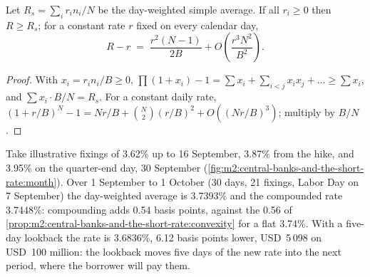 \begin{proposition}\label{prop:m2:central-banks-and-the-short-rate:convexity}
Let $R_s = \sum_i r_i n_i / N$ be the day-weighted simple average. If all
$r_i \ge 0$ then $R \ge R_s$; for a constant rate $r$ fixed on every calendar
day,
\[
R - r \;=\; \frac{r^2 (N-1)}{2B} + O\!\left(\frac{r^3N^2}{B^2}\right).
\]
\end{proposition}
\begin{proof}
With $x_i = r_i n_i / B \ge 0$, $\prod (1 + x_i) - 1 = \sum x_i + \sum_{i<j}
x_i x_j + \dots \ge \sum x_i$, and $\sum x_i \cdot B/N = R_s$. For a constant
daily rate, $(1 + r/B)^N - 1 = Nr/B + \binom{N}{2}(r/B)^2 + O((Nr/B)^3)$;
multiply by $B/N$.
\end{proof}

\begin{example}\label{ex:m2:central-banks-and-the-short-rate:month}
Take illustrative fixings of 3.62\% up to 16 September, 3.87\% from the
hike, and 3.95\% on the quarter-end day, 30 September
(\cref{fig:m2:central-banks-and-the-short-rate:month}). Over 1 September to
1 October (30 days, 21 fixings, Labor Day on 7 September) the day-weighted
average is 3.7393\% and the compounded rate 3.7448\%: compounding adds 0.54
basis points, against the 0.56 of \cref{prop:m2:central-banks-and-the-short-rate:convexity}
for a flat 3.74\%. With a five-day lookback the rate is 3.6836\%, 6.12 basis
points lower, USD~5\,098 on USD~100 million: the lookback moves five days of
the new rate into the next period, where the borrower will pay them.
\end{example}

\begin{omfigure}

\label{fig:m2:central-banks-and-the-short-rate:month}
\end{omfigure}

